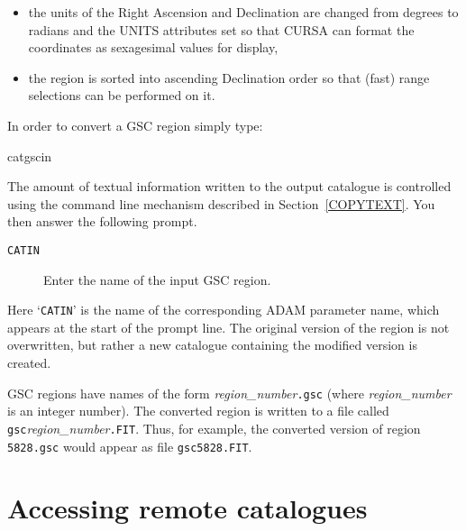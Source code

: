 \documentclass[twoside,11pt]{starlink}
\begin{document}
\begin{itemize}

  \item the units of the Right Ascension and Declination are changed
   from degrees to radians and the UNITS attributes set so that CURSA
   can format the coordinates as sexagesimal values for display,

  \item the region is sorted into ascending Declination order so that
   (fast) range selections can be performed on it.

\end{itemize}

In order to convert a GSC region simply type:

\begin{terminalv}
catgscin
\end{terminalv}

The amount of textual
information written to the output catalogue is controlled using the
command line mechanism described in Section~\ref{COPYTEXT}.
You then answer the following prompt.

\begin{description}

  \item[ \texttt{CATIN} ] Enter the name of the input GSC region.

\end{description}

Here `\texttt{CATIN}' is the name of the corresponding ADAM parameter name,
which appears at the start of the prompt line.  The original version of
the region is not overwritten, but rather a new catalogue containing the
modified version is created.

GSC regions have names of the form \textit{region\_number}\texttt{.gsc} (where
\textit{region\_number}\, is an integer number).  The converted region is
written to a file called \texttt{gsc}\textit{region\_number}\texttt{.FIT}. Thus,
for example, the converted version of region \texttt{5828.gsc} would appear
as file \texttt{gsc5828.FIT}.


\section{\label{REMACCSS}Accessing remote catalogues}
\end{document}
